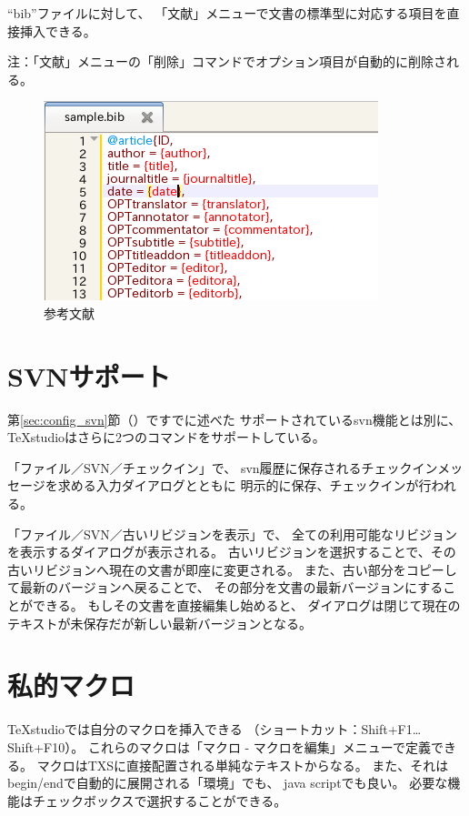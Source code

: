 ``bib''ファイルに対して、
「文献」メニューで文書の標準型に対応する項目を直接挿入できる。

注：「文献」メニューの「削除」コマンドでオプション項目が自動的に削除される。

\begin{figure}[H]
  \centering
  \includegraphics{doc16.png}
  \caption{参考文献}
\end{figure}

\section{SVNサポート}\label{sec:svnsupport}

第\ref{sec:config_svn}節（）ですでに述べた
サポートされているsvn機能とは別に、
TeXstudioはさらに2つのコマンドをサポートしている。

「ファイル／SVN／チェックイン」で、
svn履歴に保存されるチェックインメッセージを求める入力ダイアログとともに
明示的に保存、チェックインが行われる。

「ファイル／SVN／古いリビジョンを表示」で、
全ての利用可能なリビジョンを表示するダイアログが表示される。
古いリビジョンを選択することで、その古いリビジョンへ現在の文書が即座に変更される。
また、古い部分をコピーして最新のバージョンへ戻ることで、
その部分を文書の最新バージョンにすることができる。
もしその文書を直接編集し始めると、
ダイアログは閉じて現在のテキストが未保存だが新しい最新バージョンとなる。

\section{私的マクロ}

TeXstudioでは自分のマクロを挿入できる
（ショートカット：Shift+F1\ldots{}Shift+F10）。
これらのマクロは「マクロ - マクロを編集」メニューで定義できる。
マクロはTXSに直接配置される単純なテキストからなる。
また、それはbegin/endで自動的に展開される「環境」でも、
java scriptでも良い。
必要な機能はチェックボックスで選択することができる。

